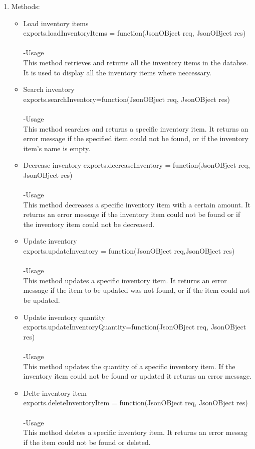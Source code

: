 \documentclass[a4paper,12pt]{report}
\begin{document}
 \begin{enumerate}
 \item Methods:
 	\begin{itemize}
 	\item Load inventory items\\
 	exports.loadInventoryItems = function(JsonOBject req, JsonOBject res)\\ \\
 	-Usage\\
 	This method retrieves and returns all the inventory items in the databse. It is used to display all the inventory items where neccessary.
 	\item Search inventory\\
 	exports.searchInventory=function(JsonOBject req, JsonOBject res)\\ \\
 	-Usage\\
 	This method searches and returns a specific inventory item. It returns an error message if the specified item could not be found, or if the inventory item's name is empty.

 	\item Decrease inventory
 	exports.decreaseInventory = function(JsonOBject req, JsonOBject res) \\ \\
 	-Usage\\
 	This method decreases a specific inventory item with a certain amount. It returns an error message if the inventory item could not be found or if the inventory item could not be decreased.
 	\item Update inventory\\
 	exports.updateInventory = function(JsonOBject req,JsonOBject  res)\\ \\
 	-Usage\\
 	This method updates a specific inventory item. It returns an error message if the item to be updated was  not found, or if the item could not be updated.
 	\item Update inventory quantity
 	exports.updateInventoryQuantity=function(JsonOBject req, JsonOBject res)\\ \\
 	-Usage\\
 	This method updates the quantity of a specific inventory item. If the inventory item could not be found or updated it returns an error message.
 	\item Delte inventory item\\
 	exports.deleteInventoryItem = function(JsonOBject req, JsonOBject res)\\ \\
 
 	-Usage\\
 	This method deletes a specific inventory item. It returns an error messag if the item could not be found or deleted.
 	\end{itemize}
 \end{enumerate}
 
\end{document}
